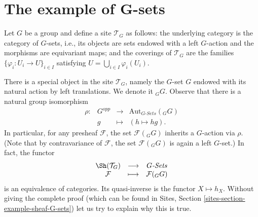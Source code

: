 \section{The example of G-sets}
\label{section-G-sets}

\noindent
Let $G$ be a group and define a site $\mathcal{T}_G$ as follows: the underlying
category is the category of $G$-sets, i.e., its objects are sets endowed
with a left $G$-action and the morphisms are equivariant maps; and the
coverings of $\mathcal{T}_G$ are the families
$\{\varphi_i : U_i \to U\}_{i\in I}$ satisfying
$U = \bigcup_{i\in I} \varphi_i(U_i)$.

\medskip\noindent
There is a special object in the site $\mathcal{T}_G$, namely the $G$-set $G$
endowed with its natural action by left translations. We denote it ${}_G G$.
Observe that there is a natural group isomorphism
$$
\begin{matrix}
\rho: & G^{opp} & \longrightarrow & \text{Aut}_{G\textit{-Sets}}({}_G G) \\
& g & \longmapsto & (h \mapsto hg).
\end{matrix}
$$
In particular, for any presheaf $\mathcal{F}$, the set $\mathcal{F}({}_G G)$
inherits a $G$-action via $\rho$. (Note that by contravariance of
$\mathcal{F}$, the set $\mathcal{F}({}_G G)$ is again a left $G$-set.) In fact,
the functor
$$
\begin{matrix}
\Sh(\mathcal{T}_G) & \longrightarrow & G\textit{-Sets} \\
\mathcal{F} & \longmapsto & \mathcal{F}({}_G G)
\end{matrix}
$$
is an equivalence of categories. Its quasi-inverse is the functor $X \mapsto
h_X$. Without giving the complete proof (which can be found in
Sites, Section \ref{sites-section-example-sheaf-G-sets})
let us try to explain why this is true.
